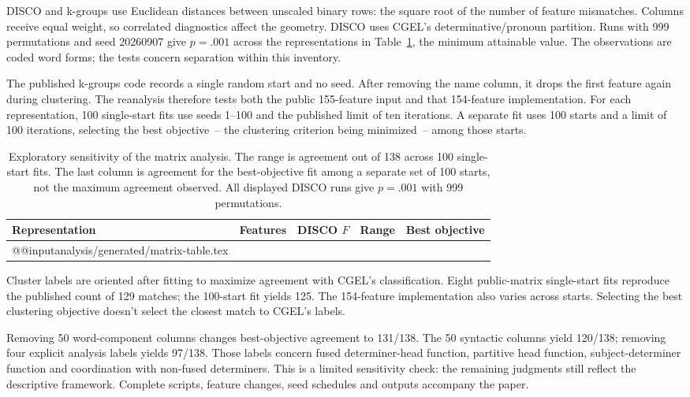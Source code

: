 \documentclass[12pt]{article}
\makeatletter
\newcommand{\tablebody}[1]{\csname @@input\endcsname #1 }
\makeatother
\begin{document}
DISCO and k-groups use Euclidean distances between unscaled binary rows: the square root of the number of feature mismatches. Columns receive equal weight, so correlated diagnostics affect the geometry. DISCO uses CGEL's determinative/pronoun partition. Runs with 999 permutations and seed 20260907 give $p=.001$ across the representations in Table~\ref{tab:matrix}, the minimum attainable value. The observations are coded word forms; the tests concern separation within this inventory.

The published k-groups code records a single random start and no seed. After removing the name column, it drops the first feature again during clustering. The reanalysis therefore tests both the public 155-feature input and that 154-feature implementation. For each representation, 100 single-start fits use seeds 1--100 and the published limit of ten iterations. A separate fit uses 100 starts and a limit of 100 iterations, selecting the best objective~-- the clustering criterion being minimized~-- among those starts.

\begin{table}[htbp]
\centering\small
\caption{Exploratory sensitivity of the matrix analysis. The range is agreement out of 138 across 100 single-start fits. The last column is agreement for the best-objective fit among a separate set of 100 starts, not the maximum agreement observed. All displayed DISCO runs give $p=.001$ with 999 permutations.}\label{tab:matrix}
\begin{tabular}{>{\raggedright\arraybackslash}p{5.1cm}rrrr}
\toprule
Representation & Features & DISCO $F$ & Range & Best objective \\
\midrule
\tablebody{analysis/generated/matrix-table.tex}
\bottomrule
\end{tabular}
\end{table}

Cluster labels are oriented after fitting to maximize agreement with CGEL's classification. Eight public-matrix single-start fits reproduce the published count of 129 matches; the 100-start fit yields 125. The 154-feature implementation also varies across starts. Selecting the best clustering objective doesn't select the closest match to CGEL's labels.

Removing 50 word-component columns changes best-objective agreement to 131/138. The 50 syntactic columns yield 120/138; removing four explicit analysis labels yields 97/138. Those labels concern fused determiner-head function, partitive head function, subject-determiner function and coordination with non-fused determiners. This is a limited sensitivity check: the remaining judgments still reflect the descriptive framework. Complete scripts, feature changes, seed schedules and outputs accompany the paper.

\clearpage
\printbibliography
\end{document}
